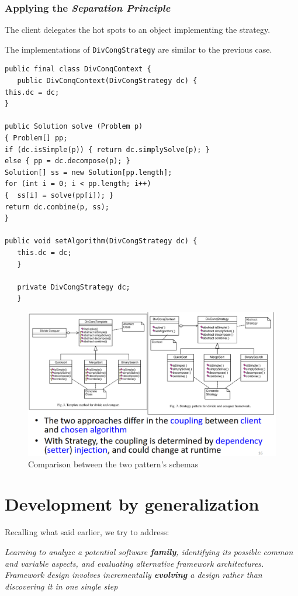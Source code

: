 \subsubsection{Applying the \textit{Separation Principle}}
   The client delegates the hot spots to an object implementing the strategy.

   The implementations of \lstinline|DivCongStrategy| are similar to the previous case.
   
   \begin{lstlisting}
public final class DivConqContext {
   public DivConqContext(DivCongStrategy dc) {
this.dc = dc;
}

public Solution solve (Problem p)
{ Problem[] pp;
if (dc.isSimple(p)) { return dc.simplySolve(p); }
else { pp = dc.decompose(p); }
Solution[] ss = new Solution[pp.length];
for (int i = 0; i < pp.length; i++)
{  ss[i] = solve(pp[i]); }
return dc.combine(p, ss);
}

public void setAlgorithm(DivCongStrategy dc) {
   this.dc = dc;
   }
   
   private DivCongStrategy dc;
   }
\end{lstlisting}

\begin{figure}[htbp]
   \centering
   \includegraphics{images/dp_comparison.png}
   \caption{Comparison between the two pattern's schemas}
   \label{fig:dp_comparison}
\end{figure}

\section{Development by generalization}

Recalling what said earlier, we try to address:
\begin{center}
   \textit{Learning to analyze a potential software \textbf{family}, identifying its
   possible common and variable aspects, and evaluating
   alternative framework architectures. Framework design involves
   incrementally \textbf{evolving} a design rather than discovering it in one
   single step}
\end{center}

